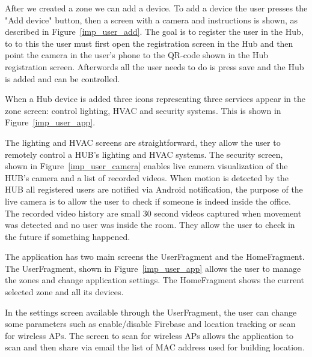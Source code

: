 After we created a zone we can add a device. To add a device the user presses the "Add device" button, then a screen with a camera and instructions is shown, as described in Figure~\ref{imp_user_add}. The goal is to register the user in the Hub, to to this the user must first open the registration screen in the Hub and then point the camera in the user's phone to the QR-code shown in the Hub registration screen. Afterwords all the user needs to do is press save and the Hub is added and can be controlled.


When a Hub device is added three icons representing three services appear in the zone screen: control lighting, \ac{HVAC} and security systems. This is shown in Figure~\ref{imp_user_app}.

The lighting and \ac{HVAC} screens are straightforward, they allow the user to remotely control a HUB's lighting and \ac{HVAC} systems. The security screen, shown in Figure~\ref{imp_user_camera} enables live camera visualization of the HUB's camera and a list of recorded videos. When motion is detected by the HUB all registered users are notified via Android notification, the purpose of the live camera is to allow the user to check if someone is indeed inside the office. The recorded video history are small 30 second videos captured when movement was detected and no user was inside the room. They allow the user to check in the future if something happened.


The application has two main screens the UserFragment and the HomeFragment. The UserFragment, shown in Figure~\ref{imp_user_app} allows the user to manage the zones and change application settings. The HomeFragment shows the current selected zone and all its devices.

In the settings screen available through the UserFragment, the user can change some parameters such as enable/disable Firebase and location tracking or scan for wireless APs. The screen to scan for wireless APs allows the application to scan and then share via email the list of \ac{MAC address} used for building location.



